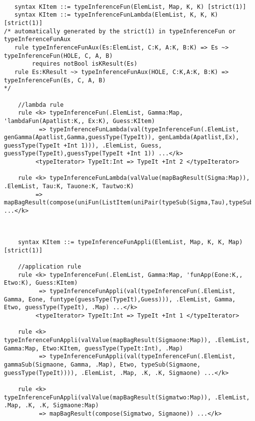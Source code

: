 \begin{lstlisting}

   syntax KItem ::= typeInferenceFun(ElemList, Map, K, K) [strict(1)]
   syntax KItem ::= typeInferenceFunLambda(ElemList, K, K, K) [strict(1)]
/* automatically generated by the strict(1) in typeInferenceFun or typeInferenceFunAux
   rule typeInferenceFunAux(Es:ElemList, C:K, A:K, B:K) => Es ~> typeInferenceFun(HOLE, C, A, B)
        requires notBool isKResult(Es)
   rule Es:KResult ~> typeInferenceFunAux(HOLE, C:K,A:K, B:K) => typeInferenceFun(Es, C, A, B)
*/     

    //lambda rule
    rule <k> typeInferenceFun(.ElemList, Gamma:Map, 'lambdaFun(Apatlist:K,, Ex:K), Guess:KItem)
          => typeInferenceFunLambda(val(typeInferenceFun(.ElemList, genGamma(Apatlist,Gamma,guessType(TypeIt)), genLambda(Apatlist,Ex), guessType(TypeIt +Int 1))), .ElemList, Guess, guessType(TypeIt),guessType(TypeIt +Int 1)) ...</k>
         <typeIterator> TypeIt:Int => TypeIt +Int 2 </typeIterator>

    rule <k> typeInferenceFunLambda(valValue(mapBagResult(Sigma:Map)), .ElemList, Tau:K, Tauone:K, Tautwo:K)
         => mapBagResult(compose(uniFun(ListItem(uniPair(typeSub(Sigma,Tau),typeSub(Sigma,funtype(Tauone,Tautwo))))),Sigma)) ...</k>
    
\end{lstlisting}

\begin{prooftree}
\end{prooftree}

\begin{lstlisting}

    syntax KItem ::= typeInferenceFunAppli(ElemList, Map, K, K, Map) [strict(1)]

    //application rule
    rule <k> typeInferenceFun(.ElemList, Gamma:Map, 'funApp(Eone:K,, Etwo:K), Guess:KItem)
          => typeInferenceFunAppli(val(typeInferenceFun(.ElemList, Gamma, Eone, funtype(guessType(TypeIt),Guess))), .ElemList, Gamma, Etwo, guessType(TypeIt), .Map) ...</k>
         <typeIterator> TypeIt:Int => TypeIt +Int 1 </typeIterator>

    rule <k> typeInferenceFunAppli(valValue(mapBagResult(Sigmaone:Map)), .ElemList, Gamma:Map, Etwo:KItem, guessType(TypeIt:Int), .Map)
          => typeInferenceFunAppli(val(typeInferenceFun(.ElemList, gammaSub(Sigmaone, Gamma, .Map), Etwo, typeSub(Sigmaone, guessType(TypeIt)))), .ElemList, .Map, .K, .K, Sigmaone) ...</k>

    rule <k> typeInferenceFunAppli(valValue(mapBagResult(Sigmatwo:Map)), .ElemList, .Map, .K, .K, Sigmaone:Map)
          => mapBagResult(compose(Sigmatwo, Sigmaone)) ...</k>

\end{lstlisting}

